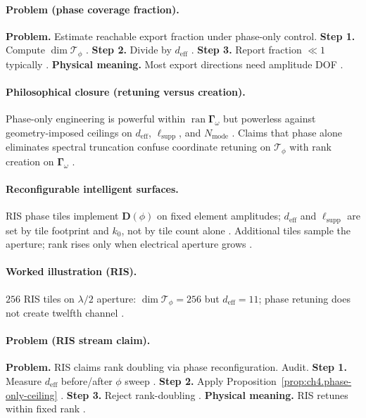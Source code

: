\paragraph{Problem (phase coverage fraction).}
\textbf{Problem.} Estimate reachable export fraction under phase-only control.
\textbf{Step 1.} Compute \(\dim\mathcal{T}_{\phi}\) \cite{harrington2001,stratton1941}.
\textbf{Step 2.} Divide by \(d_{\mathrm{eff}}\) \cite{hansen1988,devaney2004}.
\textbf{Step 3.} Report fraction \(\ll1\) typically \cite{jackson1999,collin2001}.
\textbf{Physical meaning.} Most export directions need amplitude DOF \cite{harrington2001}.

\paragraph{Philosophical closure (retuning versus creation).}
Phase-only engineering is powerful within \(\operatorname{ran}\boldsymbol{\Gamma}_\omega\) but powerless against geometry-imposed ceilings on
\(d_{\mathrm{eff}}\), \(\ell_{\mathrm{supp}}\), and \(N_{\mathrm{mode}}\) \cite{stratton1941,harrington2001,jackson1999,hansen1988,devaney2004}.
Claims that phase alone eliminates spectral truncation confuse coordinate retuning on \(\mathcal{T}_{\phi}\) with rank creation on \(\boldsymbol{\Gamma}_\omega\)
\cite{collin2001,stratton1941}.

\paragraph{Reconfigurable intelligent surfaces.}
RIS phase tiles implement \(\mathbf{D}(\phi)\) on fixed element amplitudes; \(d_{\mathrm{eff}}\) and \(\ell_{\mathrm{supp}}\) are set by tile footprint and \(k_{0}\),
not by tile count alone \cite{stratton1941,harrington2001,hansen1988,collin2001,jackson1999,devaney2004}. Additional tiles sample the aperture; rank rises only when
electrical aperture grows \cite{harrington2001,stratton1941}.

\paragraph{Worked illustration (RIS).}
\(256\) RIS tiles on \(\lambda/2\) aperture: \(\dim\mathcal{T}_{\phi}=256\) but \(d_{\mathrm{eff}}=11\); phase retuning does not create twelfth channel
\cite{harrington2001,collin2001,hansen1988,stratton1941,devaney2004,jackson1999}.

\paragraph{Problem (RIS stream claim).}
\textbf{Problem.} RIS claims rank doubling via phase reconfiguration. Audit.
\textbf{Step 1.} Measure \(d_{\mathrm{eff}}\) before/after \(\phi\) sweep \cite{harrington2001,hansen1988}.
\textbf{Step 2.} Apply Proposition~\ref{prop:ch4.phase-only-ceiling} \cite{stratton1941,devaney2004}.
\textbf{Step 3.} Reject rank-doubling \cite{jackson1999,collin2001}.
\textbf{Physical meaning.} RIS retunes within fixed rank \cite{harrington2001}.

